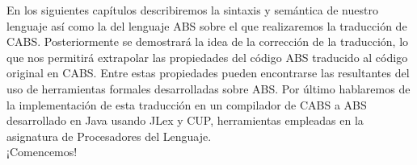 En los siguientes capítulos describiremos la sintaxis y semántica de nuestro lenguaje así como la del lenguaje ABS sobre el que realizaremos la traducción de CABS. Posteriormente se demostrará la idea de la corrección de la traducción, lo que nos permitirá extrapolar las propiedades del código ABS traducido al código original en CABS. Entre estas propiedades pueden encontrarse las resultantes del uso de herramientas formales desarrolladas sobre ABS. Por último hablaremos de la implementación de esta traducción en un compilador de CABS a ABS desarrollado en Java usando JLex y CUP, herramientas empleadas en la asignatura de Procesadores del Lenguaje.\\

¡Comencemos!
